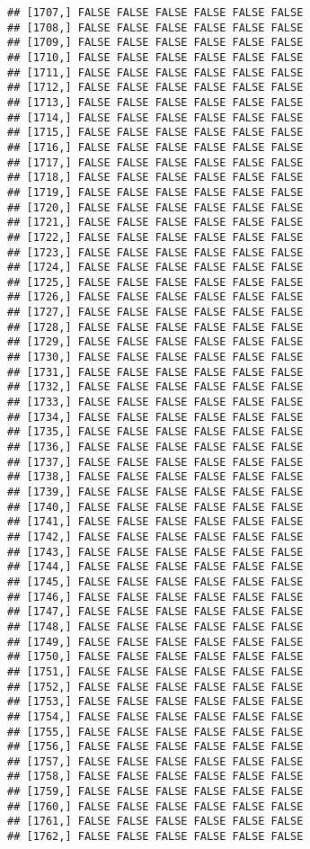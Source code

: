 \documentclass[
]{article}
\begin{document}
\begin{verbatim}
## [1707,] FALSE FALSE FALSE FALSE FALSE FALSE
## [1708,] FALSE FALSE FALSE FALSE FALSE FALSE
## [1709,] FALSE FALSE FALSE FALSE FALSE FALSE
## [1710,] FALSE FALSE FALSE FALSE FALSE FALSE
## [1711,] FALSE FALSE FALSE FALSE FALSE FALSE
## [1712,] FALSE FALSE FALSE FALSE FALSE FALSE
## [1713,] FALSE FALSE FALSE FALSE FALSE FALSE
## [1714,] FALSE FALSE FALSE FALSE FALSE FALSE
## [1715,] FALSE FALSE FALSE FALSE FALSE FALSE
## [1716,] FALSE FALSE FALSE FALSE FALSE FALSE
## [1717,] FALSE FALSE FALSE FALSE FALSE FALSE
## [1718,] FALSE FALSE FALSE FALSE FALSE FALSE
## [1719,] FALSE FALSE FALSE FALSE FALSE FALSE
## [1720,] FALSE FALSE FALSE FALSE FALSE FALSE
## [1721,] FALSE FALSE FALSE FALSE FALSE FALSE
## [1722,] FALSE FALSE FALSE FALSE FALSE FALSE
## [1723,] FALSE FALSE FALSE FALSE FALSE FALSE
## [1724,] FALSE FALSE FALSE FALSE FALSE FALSE
## [1725,] FALSE FALSE FALSE FALSE FALSE FALSE
## [1726,] FALSE FALSE FALSE FALSE FALSE FALSE
## [1727,] FALSE FALSE FALSE FALSE FALSE FALSE
## [1728,] FALSE FALSE FALSE FALSE FALSE FALSE
## [1729,] FALSE FALSE FALSE FALSE FALSE FALSE
## [1730,] FALSE FALSE FALSE FALSE FALSE FALSE
## [1731,] FALSE FALSE FALSE FALSE FALSE FALSE
## [1732,] FALSE FALSE FALSE FALSE FALSE FALSE
## [1733,] FALSE FALSE FALSE FALSE FALSE FALSE
## [1734,] FALSE FALSE FALSE FALSE FALSE FALSE
## [1735,] FALSE FALSE FALSE FALSE FALSE FALSE
## [1736,] FALSE FALSE FALSE FALSE FALSE FALSE
## [1737,] FALSE FALSE FALSE FALSE FALSE FALSE
## [1738,] FALSE FALSE FALSE FALSE FALSE FALSE
## [1739,] FALSE FALSE FALSE FALSE FALSE FALSE
## [1740,] FALSE FALSE FALSE FALSE FALSE FALSE
## [1741,] FALSE FALSE FALSE FALSE FALSE FALSE
## [1742,] FALSE FALSE FALSE FALSE FALSE FALSE
## [1743,] FALSE FALSE FALSE FALSE FALSE FALSE
## [1744,] FALSE FALSE FALSE FALSE FALSE FALSE
## [1745,] FALSE FALSE FALSE FALSE FALSE FALSE
## [1746,] FALSE FALSE FALSE FALSE FALSE FALSE
## [1747,] FALSE FALSE FALSE FALSE FALSE FALSE
## [1748,] FALSE FALSE FALSE FALSE FALSE FALSE
## [1749,] FALSE FALSE FALSE FALSE FALSE FALSE
## [1750,] FALSE FALSE FALSE FALSE FALSE FALSE
## [1751,] FALSE FALSE FALSE FALSE FALSE FALSE
## [1752,] FALSE FALSE FALSE FALSE FALSE FALSE
## [1753,] FALSE FALSE FALSE FALSE FALSE FALSE
## [1754,] FALSE FALSE FALSE FALSE FALSE FALSE
## [1755,] FALSE FALSE FALSE FALSE FALSE FALSE
## [1756,] FALSE FALSE FALSE FALSE FALSE FALSE
## [1757,] FALSE FALSE FALSE FALSE FALSE FALSE
## [1758,] FALSE FALSE FALSE FALSE FALSE FALSE
## [1759,] FALSE FALSE FALSE FALSE FALSE FALSE
## [1760,] FALSE FALSE FALSE FALSE FALSE FALSE
## [1761,] FALSE FALSE FALSE FALSE FALSE FALSE
## [1762,] FALSE FALSE FALSE FALSE FALSE FALSE

\end{verbatim}
\end{document}
